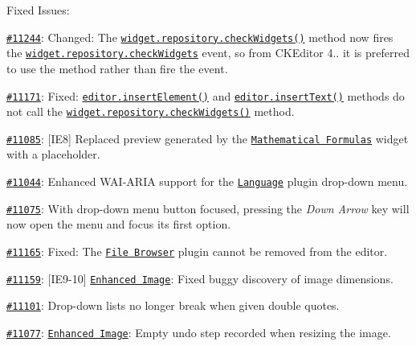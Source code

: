 {\ttfamily Fixed Issues\+:}

{\ttfamily 
\begin{DoxyItemize}
\item \href{http://dev.ckeditor.com/ticket/11244}{\tt \#11244}\+: Changed\+: The \href{http://docs.ckeditor.com/#!/api/CKEDITOR.plugins.widget.repository-method-checkWidgets}{\tt {\ttfamily widget.\+repository.\+check\+Widgets()}} method now fires the \href{http://docs.ckeditor.com/#!/api/CKEDITOR.plugins.widget.repository-event-checkWidgets}{\tt {\ttfamily widget.\+repository.\+check\+Widgets}} event, so from C\+K\+Editor 4.. it is preferred to use the method rather than fire the event.
\item \href{http://dev.ckeditor.com/ticket/11171}{\tt \#11171}\+: Fixed\+: \href{http://docs.ckeditor.com/#!/api/CKEDITOR.editor-method-insertElement}{\tt {\ttfamily editor.\+insert\+Element()}} and \href{http://docs.ckeditor.com/#!/api/CKEDITOR.editor-method-insertText}{\tt {\ttfamily editor.\+insert\+Text()}} methods do not call the \href{http://docs.ckeditor.com/#!/api/CKEDITOR.plugins.widget.repository-method-checkWidgets}{\tt {\ttfamily widget.\+repository.\+check\+Widgets()}} method.
\item \href{http://dev.ckeditor.com/ticket/11085}{\tt \#11085}\+: \mbox{[}I\+E8\mbox{]} Replaced preview generated by the \href{http://ckeditor.com/addon/mathjax}{\tt Mathematical Formulas} widget with a placeholder.
\item \href{http://dev.ckeditor.com/ticket/11044}{\tt \#11044}\+: Enhanced W\+A\+I-\/\+A\+R\+IA support for the \href{http://ckeditor.com/addon/language}{\tt Language} plugin drop-\/down menu.
\item \href{http://dev.ckeditor.com/ticket/11075}{\tt \#11075}\+: With drop-\/down menu button focused, pressing the {\itshape Down Arrow} key will now open the menu and focus its first option.
\item \href{http://dev.ckeditor.com/ticket/11165}{\tt \#11165}\+: Fixed\+: The \href{http://ckeditor.com/addon/filebrowser}{\tt File Browser} plugin cannot be removed from the editor.
\item \href{http://dev.ckeditor.com/ticket/11159}{\tt \#11159}\+: \mbox{[}I\+E9-\/10\mbox{]} \href{http://ckeditor.com/addon/image2}{\tt Enhanced Image}\+: Fixed buggy discovery of image dimensions.
\item \href{http://dev.ckeditor.com/ticket/11101}{\tt \#11101}\+: Drop-\/down lists no longer break when given double quotes.
\item \href{http://dev.ckeditor.com/ticket/11077}{\tt \#11077}\+: \href{http://ckeditor.com/addon/image2}{\tt Enhanced Image}\+: Empty undo step recorded when resizing the image.

\end{DoxyItemize}}
